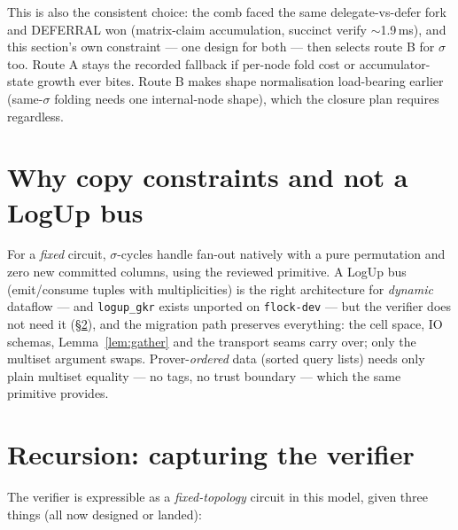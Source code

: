 \documentclass[11pt]{article}
\newcommand{\code}[1]{\texttt{#1}}
\theoremstyle{definition}
\begin{document}
This is also the consistent choice: the comb faced the same
delegate-vs-defer fork and DEFERRAL won (matrix-claim accumulation,
succinct verify $\sim$1.9\,ms), and this section's own constraint ---
one design for both --- then selects route B for $\sigma$ too. Route A
stays the recorded fallback if per-node fold cost or accumulator-state
growth ever bites. Route B makes shape normalisation load-bearing
earlier (same-$\sigma$ folding needs one internal-node shape), which
the closure plan requires regardless.

\section{Why copy constraints and not a LogUp bus}\label{sec:logup}

For a \emph{fixed} circuit, $\sigma$-cycles handle fan-out natively with a
pure permutation and zero new committed columns, using the reviewed
primitive. A LogUp bus (emit/consume tuples with multiplicities) is the
right architecture for \emph{dynamic} dataflow --- and \code{logup\_gkr}
exists unported on \code{flock-dev} --- but the verifier does not need it
(\S\ref{sec:recursion}), and the migration path preserves everything: the
cell space, IO schemas, Lemma~\ref{lem:gather} and the transport seams
carry over; only the multiset argument swaps. Prover-\emph{ordered} data
(sorted query lists) needs only plain multiset equality --- no tags, no
trust boundary --- which the same primitive provides.

\section{Recursion: capturing the verifier}\label{sec:recursion}

The verifier is expressible as a \emph{fixed-topology} circuit in this
model, given three things (all now designed or landed):
\end{document}
